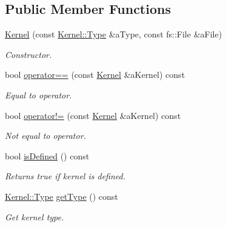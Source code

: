 \subsection*{Public Member Functions}
\begin{DoxyCompactItemize}
\item 
\hyperlink{classostk_1_1physics_1_1env_1_1ephem_1_1spice_1_1_kernel_afba440f0d5553591d9217c2a5e7035b5}{Kernel} (const \hyperlink{classostk_1_1physics_1_1env_1_1ephem_1_1spice_1_1_kernel_a76d560bbface15a0cb24cd82e9a93d77}{Kernel\+::\+Type} \&a\+Type, const fs\+::\+File \&a\+File)
\begin{DoxyCompactList}\small\item\em Constructor. \end{DoxyCompactList}\item 
bool \hyperlink{classostk_1_1physics_1_1env_1_1ephem_1_1spice_1_1_kernel_a4499b4c8a89b9aa99fe90bac124e89ef}{operator==} (const \hyperlink{classostk_1_1physics_1_1env_1_1ephem_1_1spice_1_1_kernel}{Kernel} \&a\+Kernel) const
\begin{DoxyCompactList}\small\item\em Equal to operator. \end{DoxyCompactList}\item 
bool \hyperlink{classostk_1_1physics_1_1env_1_1ephem_1_1spice_1_1_kernel_a1b2d11521cac8056058e774eee8082ae}{operator!=} (const \hyperlink{classostk_1_1physics_1_1env_1_1ephem_1_1spice_1_1_kernel}{Kernel} \&a\+Kernel) const
\begin{DoxyCompactList}\small\item\em Not equal to operator. \end{DoxyCompactList}\item 
bool \hyperlink{classostk_1_1physics_1_1env_1_1ephem_1_1spice_1_1_kernel_a06668d90a8b74338de4863880d362239}{is\+Defined} () const
\begin{DoxyCompactList}\small\item\em Returns true if kernel is defined. \end{DoxyCompactList}\item 
\hyperlink{classostk_1_1physics_1_1env_1_1ephem_1_1spice_1_1_kernel_a76d560bbface15a0cb24cd82e9a93d77}{Kernel\+::\+Type} \hyperlink{classostk_1_1physics_1_1env_1_1ephem_1_1spice_1_1_kernel_a4b592a8ad9e7dd8c44807b53afafaf3b}{get\+Type} () const
\begin{DoxyCompactList}\small\item\em Get kernel type. \end{DoxyCompactList}\item 

\end{DoxyCompactItemize}
